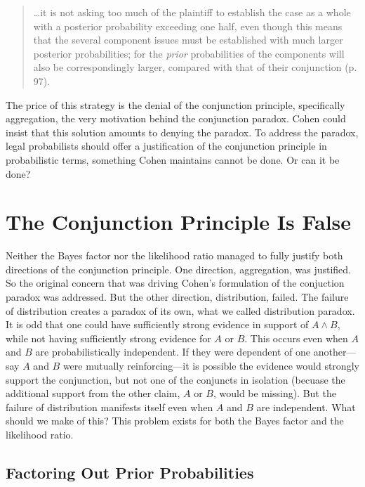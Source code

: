 \documentclass[
  10pt,
  dvipsnames,enabledeprecatedfontcommands]{scrartcl}
\begin{document}
\begin{quote}
\dots it is not asking too much of the plaintiff to establish the case as a whole with a posterior probability exceeding one half, even though this means  that the several component issues must be established with much larger posterior probabilities; for the \textit{prior}  probabilities of the components will also be correspondingly larger, compared with that of their conjunction (p. 97).
 \end{quote}

\noindent  The price of this strategy is the denial of the conjunction
principle, specifically aggregation, the very motivation behind the
conjunction paradox. Cohen could insist that this solution amounts to
denying the paradox. To address the paradox, legal probabilists should
offer a justification of the conjunction principle in probabilistic
terms, something Cohen maintains cannot be done. Or can it be done?

\hypertarget{the-conjunction-principle-is-false}{%
\section{The Conjunction Principle Is
False}\label{the-conjunction-principle-is-false}}

Neither the Bayes factor nor the likelihood ratio managed to fully
justify both directions of the conjunction principle. One direction,
aggregation, was justified. So the original concern that was driving
Cohen's formulation of the conjuction paradox was addressed. But the
other direction, distribution, failed. The failure of distribution
creates a paradox of its own, what we called distribution paradox. It is
odd that one could have sufficiently strong evidence in support of
\(A\wedge B\), while not having sufficiently strong evidence for \(A\)
or \(B\). This occurs even when \(A\) and \(B\) are probabilistically
independent. If they were dependent of one another---say \(A\) and \(B\)
were mutually reinforcing---it is possible the evidence would strongly
support the conjunction, but not one of the conjuncts in isolation
(becuase the additional support from the other claim, \(A\) or \(B\),
would be missing). But the failure of distribution manifests itself even
when \(A\) and \(B\) are independent. What should we make of this? This
problem exists for both the Bayes factor and the likelihood ratio.

\hypertarget{factoring-out-prior-probabilities}{%
\subsection{Factoring Out Prior
Probabilities}\label{factoring-out-prior-probabilities}}
\end{document}
